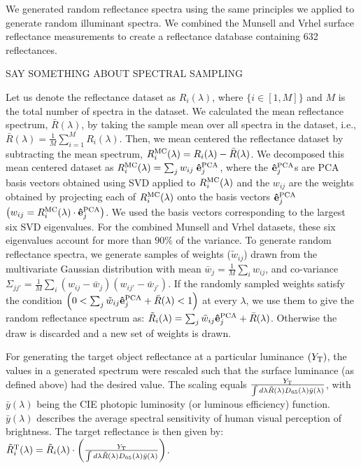 \documentclass{jov}
\begin{document}
We generated random reflectance spectra using the same principles we applied to generate random illuminant spectra.
We combined the Munsell \cite{kelly1943tristimulus} and Vrhel \cite{vrhel1994measurement} surface reflectance 
measurements to create a reflectance database containing 632 reflectances. 

 SAY SOMETHING ABOUT SPECTRAL SAMPLING

Let us denote the reflectance dataset as $R_i(\lambda)$, where $\{i \in [1,M]\}$ 
and $M$ is the total number of spectra in the dataset. 
We calculated the mean reflectance spectrum,
$\bar{R}(\lambda)$, by taking the sample mean over all spectra in the dataset, i.e.,
$\bar{R}(\lambda) = \frac{1}{M} \sum_{i=1}^M R_i(\lambda)$. Then, we mean centered 
the reflectance dataset by subtracting the mean spectrum, $R_i^{\rm MC}(\lambda) =  R_i(\lambda)-\bar{R}(\lambda)$. 
We decomposed this mean centered dataset as $R_i^{\rm MC}(\lambda) = \sum_j{w_{ij} \; {\bf \hat{e}}_j^{\rm PCA}}$, where
the ${\bf \hat{e}}_j^{\rm PCA}$s are PCA basis vectors obtained using SVD applied to $R_i^{\rm MC}(\lambda)$
and the $w_{ij}$ are the weights obtained by projecting each of $R_i^{\rm MC}(\lambda)$ onto the basis vectors ${\bf \hat{e}}_j^{\rm PCA}$ 
$\left( w_{ij} = R_i^{\rm MC}(\lambda)\cdot {\bf \hat{e}}_j^{\rm PCA}\right)$. 
We used the basis vectors corresponding to the largest six SVD eigenvalues. 
For the combined Munsell and Vrhel datasets, these six eigenvalues account for 
more than $90\%$ of the variance. 
To generate random reflectance spectra, we generate samples of weights ($\tilde{w}_{ij}$) drawn from the multivariate Gaussian 
distribution with mean $\bar{w}_j = \frac{1}{M}\sum_i w_{ij}$, 
and co-variance $\Sigma_{jj'} = \frac{1}{M} \sum_i \left(w_{ij} -\bar{w}_j\right)\left(w_{ij'} -\bar{w}_{j'}\right) $. If the randomly sampled weights satisfy the condition $\left( 0 < \sum_j \tilde{w}_{ij}{\bf \hat{e}}_j^{\rm PCA} + \bar{R}(\lambda)<1\right) $ at every $\lambda$, we use them to give the random reflectance spectrum as: $\tilde{R}_i(\lambda) =\sum_j \tilde{w}_{ij}{\bf \hat{e}}_j^{\rm PCA} + \bar{R}(\lambda)$.  Otherwise the draw is discarded and a new set of weights is drawn.

For generating the target object reflectance at a particular luminance $(Y_{\rm T})$, the values in a generated spectrum were 
rescaled such that the surface luminance (as defined above) had the desired value.
The scaling equals $\frac{Y_{\rm T}}{\int d\lambda \tilde{R}(\lambda) D_{65}(\lambda) \bar{y}(\lambda)}$, with $\bar{y}(\lambda)$ being the CIE photopic luminosity (or luminous efficiency) function. 
$\bar{y}(\lambda)$ describes the average spectral sensitivity of human visual 
perception of brightness. The target reflectance is then given by: $\tilde{R}^{\rm T}_i(\lambda) =\tilde{R}_i(\lambda) \cdot\left(\frac{Y_{\rm T}}{\int d\lambda \tilde{R}(\lambda) D_{65}(\lambda) \bar{y}(\lambda)}\right)$.
\end{document}

